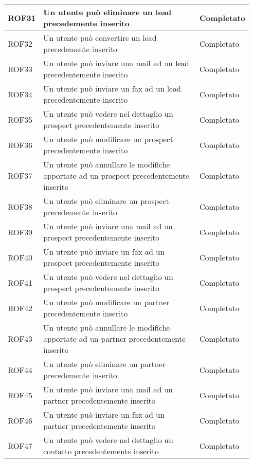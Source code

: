 \begin{longtable}[h]{|p{2.5cm}|p{8cm}|p{2.5cm}|}
	\hline
	\rule[-3mm]{0mm}{0.8cm}
	ROF31&Un utente può eliminare un lead precedemente inserito&Completato\\
	\hline
	\rule[-3mm]{0mm}{0.8cm}
	ROF32&Un utente può convertire un lead precedemente inserito&Completato\\
	\hline
	\rule[-3mm]{0mm}{0.8cm}
	ROF33&Un utente può inviare una mail ad un lead precedentemente inserito&Completato \\
	\hline
	\rule[-3mm]{0mm}{0.8cm}
	ROF34&Un utente può inviare un fax ad un lead precedentemente inserito&Completato \\
	\hline
	\rule[-3mm]{0mm}{0.8cm}
	ROF35&Un utente può vedere nel dettaglio un prospect precedentemente inserito&Completato\\
	\hline
	\rule[-3mm]{0mm}{0.8cm}
	ROF36&Un utente può modificare un prospect precedentemente inserito&Completato\\
	\hline
	\rule[-3mm]{0mm}{0.8cm}
	ROF37&Un utente può annullare le modifiche apportate ad un prospect precedentemente inserito&Completato\\
	\hline
	\rule[-3mm]{0mm}{0.8cm}
	ROF38&Un utente può eliminare un prospect precedemente inserito&Completato\\
	\hline
	\rule[-3mm]{0mm}{0.8cm}
	ROF39&Un utente può inviare una mail ad un prospect precedentemente inserito&Completato \\
	\hline
	\rule[-3mm]{0mm}{0.8cm}
	ROF40&Un utente può inviare un fax ad un prospect precedentemente inserito&Completato \\
	\hline
	\rule[-3mm]{0mm}{0.8cm}
	ROF41&Un utente può vedere nel dettaglio un prospect precedentemente inserito&Completato\\
	\hline
	\rule[-3mm]{0mm}{0.8cm}
	ROF42&Un utente può modificare un partner precedentemente inserito&Completato\\
	\hline
	\rule[-3mm]{0mm}{0.8cm}
	ROF43&Un utente può annullare le modifiche apportate ad un partner precedentemente inserito&Completato\\
	\hline
	\rule[-3mm]{0mm}{0.8cm}
	ROF44&Un utente può eliminare un partner precedemente inserito&Completato\\
	\hline
	\rule[-3mm]{0mm}{0.8cm}
	ROF45&Un utente può inviare una mail ad un partner precedentemente inserito&Completato \\
	\hline
	\rule[-3mm]{0mm}{0.8cm}
	ROF46&Un utente può inviare un fax ad un partner precedentemente inserito&Completato \\
	\hline\rule[-3mm]{0mm}{0.8cm}
	ROF47&Un utente può vedere nel dettaglio un contatto precedentemente inserito&Completato\\

\end{longtable}
